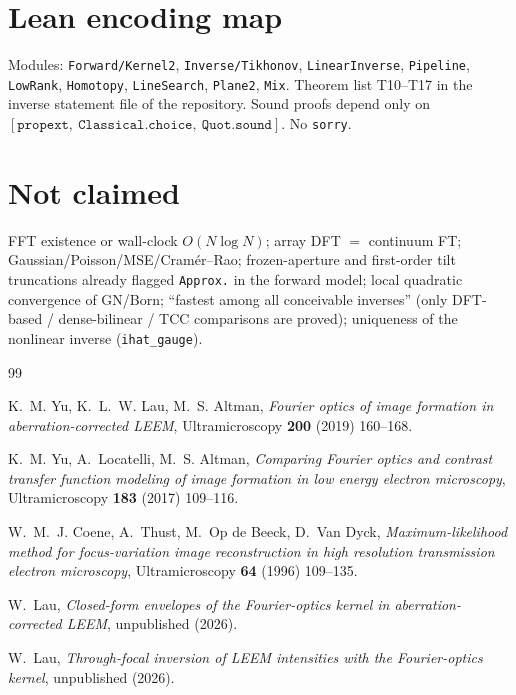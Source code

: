 \documentclass[11pt,a4paper]{article}
\theoremstyle{definition}
\theoremstyle{remark}
\begin{document}
\section{Lean encoding map}
\label{sec:lean}

Modules: \texttt{Forward/Kernel2}, \texttt{Inverse/Tikhonov},
\texttt{LinearInverse}, \texttt{Pipeline}, \texttt{LowRank},
\texttt{Homotopy}, \texttt{LineSearch}, \texttt{Plane2},
\texttt{Mix}.
Theorem list T10--T17 in the inverse statement file of the
repository.
Sound proofs depend only on
$[\mathtt{propext},\ \mathtt{Classical.choice},\ \mathtt{Quot.sound}]$.
No \texttt{sorry}.

\section{Not claimed}
\label{sec:not}

FFT existence or wall-clock $O(N\log N)$; array DFT $=$ continuum FT;
Gaussian/Poisson/MSE/Cram\'er--Rao; frozen-aperture and first-order
tilt truncations already flagged \texttt{Approx.} in the forward
model; local quadratic convergence of GN/Born; ``fastest among all
conceivable inverses'' (only DFT-based / dense-bilinear / TCC
comparisons are proved); uniqueness of the nonlinear inverse
(\texttt{ihat\_gauge}).

\begin{thebibliography}{99}

K.~M. Yu, K.~L.~W. Lau, M.~S. Altman,
\emph{Fourier optics of image formation in aberration-corrected LEEM},
Ultramicroscopy \textbf{200} (2019) 160--168.

K.~M. Yu, A.~Locatelli, M.~S. Altman,
\emph{Comparing Fourier optics and contrast transfer function modeling
of image formation in low energy electron microscopy},
Ultramicroscopy \textbf{183} (2017) 109--116.

W.~M.~J. Coene, A.~Thust, M.~Op de Beeck, D.~Van Dyck,
\emph{Maximum-likelihood method for focus-variation image
reconstruction in high resolution transmission electron microscopy},
Ultramicroscopy \textbf{64} (1996) 109--135.

W.~Lau,
\emph{Closed-form envelopes of the Fourier-optics kernel in
aberration-corrected LEEM},
unpublished (2026).

W.~Lau,
\emph{Through-focal inversion of LEEM intensities with the
Fourier-optics kernel},
unpublished (2026).

\end{thebibliography}
\end{document}
